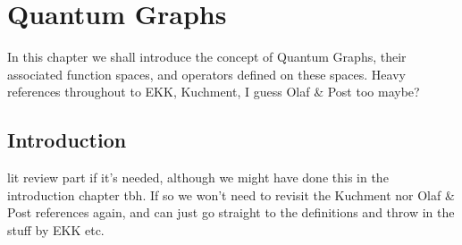 \chapter{Quantum Graphs} \label{ch:QuantumGraphs}
In this chapter we shall introduce the concept of Quantum Graphs, their associated function spaces, and operators defined on these spaces.
Heavy references throughout to EKK, Kuchment, I guess Olaf \& Post too maybe?

\section{Introduction}
lit review part if it's needed, although we might have done this in the introduction chapter tbh.
If so we won't need to revisit the Kuchment nor Olaf \& Post references again, and can just go straight to the definitions and throw in the stuff by EKK etc.

